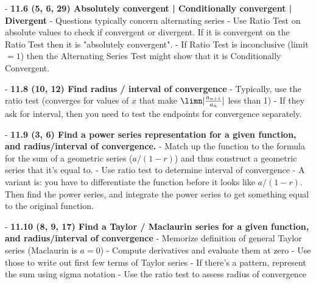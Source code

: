 - \textbf{11.6 (5, 6, 29) Absolutely convergent | Conditionally convergent | Divergent}
- Questions typically concern alternating series
- Use Ratio Test on absolute values to check if convergent or divergent. If it is convergent on the Ratio Test then it is "absolutely convergent".
- If Ratio Test is inconclusive (limit $= 1$) then the Alternating Series Test might show that it is Conditionally Convergent.

- \textbf{11.8 (10, 12) Find radius / interval of convergence}
- Typically, use the ratio test (converges for values of $x$ that make $\limn |\frac{a_{n+1}}{a_n}|$ less than 1)
- If they ask for interval, then you need to test the endpoints for convergence separately.

- \textbf{11.9 (3, 6) Find a power series representation for a given function, and radius/interval of convergence.}
- Match up the function to the formula for the sum of a geometric series ($a/(1-r)$) and thus construct a geometric series that it's equal to.
- Use ratio test to determine interval of convergence
- A variant is: you have to differentiate the function before it looks like $a/(1-r)$. Then find the power series, and integrate the power series to get something equal to the original function.

- \textbf{11.10 (8, 9, 17) Find a Taylor / Maclaurin series for a given function, and radius/interval of convergence}
- Memorize definition of general Taylor series (Maclaurin is $a=0$)
- Compute derivatives and evaluate them at zero
- Use those to write out first few terms of Taylor series
- If there's a pattern, represent the sum using sigma notation
- Use the ratio test to assess radius of convergence
